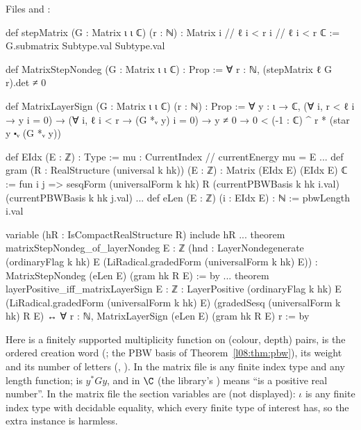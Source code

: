 {\raggedright\noindent Files  and
:\par}
\begin{leancode}
def stepMatrix (G : Matrix ι ι ℂ) (r : ℕ) : Matrix {i // ℓ i < r} {i // ℓ i < r} ℂ :=
  G.submatrix Subtype.val Subtype.val

def MatrixStepNondeg (G : Matrix ι ι ℂ) : Prop :=
  ∀ r : ℕ, (stepMatrix ℓ G r).det ≠ 0

def MatrixLayerSign (G : Matrix ι ι ℂ) (r : ℕ) : Prop :=
  ∀ y : ι → ℂ, (∀ i, r < ℓ i → y i = 0) → (∀ i, ℓ i < r → (G *ᵥ y) i = 0) → y ≠ 0 →
    0 < (-1 : ℂ) ^ r * (star y ⬝ᵥ (G *ᵥ y))

def EIdx (E : ℤ) : Type := {mu : CurrentIndex // currentEnergy mu = E}
...
def gram (R : RealStructure (universal k hk)) (E : ℤ) : Matrix (EIdx E) (EIdx E) ℂ :=
  fun i j => sesqForm (universalForm k hk) R (currentPBWBasis k hk i.val)
    (currentPBWBasis k hk j.val)
...
def eLen (E : ℤ) (i : EIdx E) : ℕ := pbwLength i.val

variable (hR : IsCompactRealStructure R)
include hR
...
theorem matrixStepNondeg_of_layerNondeg {E : ℤ}
    (hnd : LayerNondegenerate (ordinaryFlag k hk) E (LiRadical.gradedForm (universalForm k hk) E)) :
    MatrixStepNondeg (eLen E) (gram hk R E) := by
...
theorem layerPositive_iff_matrixLayerSign {E : ℤ} :
    LayerPositive (ordinaryFlag k hk) E (LiRadical.gradedForm (universalForm k hk) E)
        (gradedSesq (universalForm k hk) R E) ↔
      ∀ r : ℕ, MatrixLayerSign (eLen E) (gram hk R E) r := by
\end{leancode}
\noindent Here  is a finitely supported multiplicity function on (colour, depth) pairs,
 is the ordered creation word 
(; the PBW basis of Theorem~\ref{l08:thm:pbw}),  its weight and
 its number of letters (,
). In the matrix file  is any finite index type and 
any length function;  is $y^*Gy$, and  in $\C$ (the library's
) means ``is a positive real number''. In the matrix file the section variables are
 (not displayed): $\iota$ is any finite index type with
decidable equality, which every finite type of interest has, so the extra instance is harmless.


